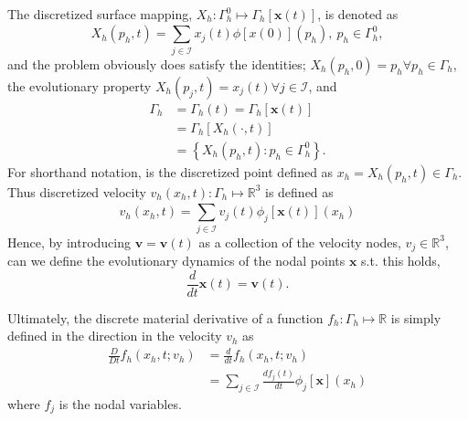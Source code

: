 The discretized surface mapping, $X_{h}: \Gamma_{h} ^{0} \mapsto  \Gamma _{h} \left[ \mathbf{x}\left( t \right)  \right] $, is denoted as \[
X_{h}\left( p_{h},t \right) = \sum_{j \in \mathcal{I} }^{}  x_{j}\left( t \right)  \phi \left[ x\left( 0 \right)  \right] \left( p_{h} \right), \  p_{h} \in \Gamma ^{0}_{h},
\]
and the problem obviously does satisfy the identities; $X_{h}\left( p_{h},0 \right)  = p_{h} \forall p_{h} \in \Gamma _{h}$, the evolutionary property $X_{h} \left( p_{j}, t \right)  = x_{j}\left( t \right)  \forall j \in \mathcal{I} $, and
\[
    \begin{split}
        \Gamma _{h} & = \Gamma_{h} \left( t \right) =   \Gamma_{h} \left[ \mathbf{x}\left( t \right)  \right]  \\
                                    &= \Gamma_{h}\left[ X_{h}\left( \cdot ,t \right)  \right] \\
&=\left\{ X_{h}\left( p_{h},t \right): p_{h} \in  \Gamma ^{0}_{h} \right\}.
    \end{split}
\]
For shorthand notation, is the discretized point defined as $x_{h} = X_{h}\left( p_{h},t \right) \in \Gamma _{h} $.
Thus discretized velocity $v_{h}\left( x_{h},t \right): \Gamma _{h} \mapsto  \mathbb{R} ^{3} $ is defined as \[
    v_{h}\left( x_{h},t \right)  = \sum_{j \in \mathcal{I} }^{} v_{j}\left( t \right) \phi _{j}\left[ \mathbf{x}\left( t \right)  \right] \left( x_{h} \right)
\]
Hence, by introducing  $\mathbf{v} = \mathbf{v}\left( t \right)  $ as a collection of the velocity nodes,  $v_{j} \in \mathbb{R} ^3$, can we define the evolutionary dynamics of the nodal points $\mathbf{x}$ s.t. this holds,
\[
\frac{d}{dt}\mathbf{x}\left( t \right) = \mathbf{v}\left( t \right).
\]

Ultimately, the discrete material derivative of a function $f_{h}: \Gamma _{h} \mapsto  \mathbb{R} $ is simply defined in the direction in the velocity $v_{h}$  as \[
    \begin{split}
\frac{D}{Dt}f_{h}\left( x_{h}, t; v_{h}   \right) & = \frac{d}{dt} f_{h}\left( x_{h}, t; v_{h}   \right) \\
 & = \sum_{j \in \mathcal{I} }^{} \frac{d f_{j} \left( t \right) }{dt} \phi _{j}\left[ \mathbf{x} \right] \left( x_{h} \right)
    \end{split}
\]
where $f_{j}$ is the nodal variables.


